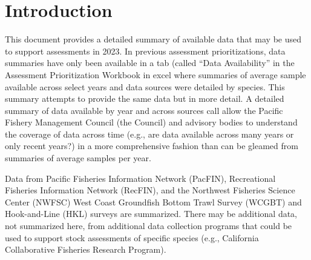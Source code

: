 \documentclass[11pt,
  english,
  letterpaper,
]{article}
\begin{document}
\pagebreak
{}
\setcounter{page}{1}

\renewcommand{\thetable}{\roman{table}}
\renewcommand{\thefigure}{\roman{figure}}

\setlength\parskip{0.5em plus 0.1em minus 0.2em}

\pagebreak
\setlength{\parskip}{5mm plus1mm minus1mm}
\setcounter{page}{1}
\renewcommand{\thefigure}{\arabic{figure}}
\renewcommand{\thetable}{\arabic{table}}
\setcounter{table}{0}
\setcounter{figure}{0}


\hypertarget{introduction}{%
\section{Introduction}\label{introduction}}

\leavevmode\tagmcend\tagstructend


This document provides a detailed summary of available data that may be used to support assessments in 2023. In previous assessment prioritizations, data summaries have only been available in a tab (called ``Data Availability'' in the Assessment Prioritization Workbook in excel where summaries of average sample available across select years and data sources were detailed by species. This summary attempts to provide the same data but in more detail. A detailed summary of data available by year and across sources call allow the Pacific Fishery Management Council (the Council) and advisory bodies to understand the coverage of data across time (e.g., are data available across many years or only recent years?) in a more comprehensive fashion than can be gleamed from summaries of average samples per year.

\leavevmode\tagmcend\tagstructend\par


Data from Pacific Fisheries Information Network (PacFIN), Recreational Fisheries Information Network (RecFIN), and the Northwest Fisheries Science Center (NWFSC) West Coast Groundfish Bottom Trawl Survey (WCGBT) and Hook-and-Line (HKL) surveys are summarized. There may be additional data, not summarized here, from additional data collection programs that could be used to support stock assessments of specific species (e.g., California Collaborative Fisheries Research Program).
\end{document}
